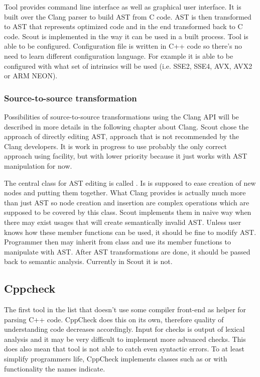 Tool provides command line interface as well as graphical user interface. It is built over the Clang parser to build AST from C code. AST is then transformed to AST that represents optimized code and in the end transformed back to C code. Scout is implemented in the way it can be used in a built process. Tool is able to be configured. Configuration file is written in C++ code so there's no need to learn different configuration language. For example it is able to be configured with what set of intrinsics will be used (i.e. SSE2, SSE4, AVX, AVX2 or ARM NEON).

\subsubsection{Source-to-source transformation}
Possibilities of source-to-source transformations using the Clang API will be described in more details in the following chapter about Clang. Scout chose the approach of directly editing AST, approach that is not recommended by the Clang developers. It is work in progress to use probably the only correct approach using  facility, but with lower priority because it just works with AST manipulation for now.

The central class for AST editing is called . Is is supposed to ease creation of new nodes and putting them together. What Clang provides is actually much more than just AST so node creation and insertion are complex operations which are supposed to be covered by this class. Scout implements them in naive way when there may exist usages that will create semantically invalid AST. Unless user knows how these member functions can be used, it should be fine to modify AST. Programmer then may inherit from  class and use its member functions to manipulate with AST. After AST transformations are done, it should be passed back to semantic analysis. Currently in Scout it is not.

\subsection{Cppcheck}
The first tool in the list that doesn't use some compiler front-end as helper for parsing C++ code. CppCheck does this on its own, therefore quality of understanding code decreases accordingly. Input for checks is output of lexical analysis and it may be very difficult to implement more advanced checks. This does also mean that tool is not able to catch even syntactic errors. To at least simplify programmers life, CppCheck implements classes such as  or  with functionality the names indicate.

